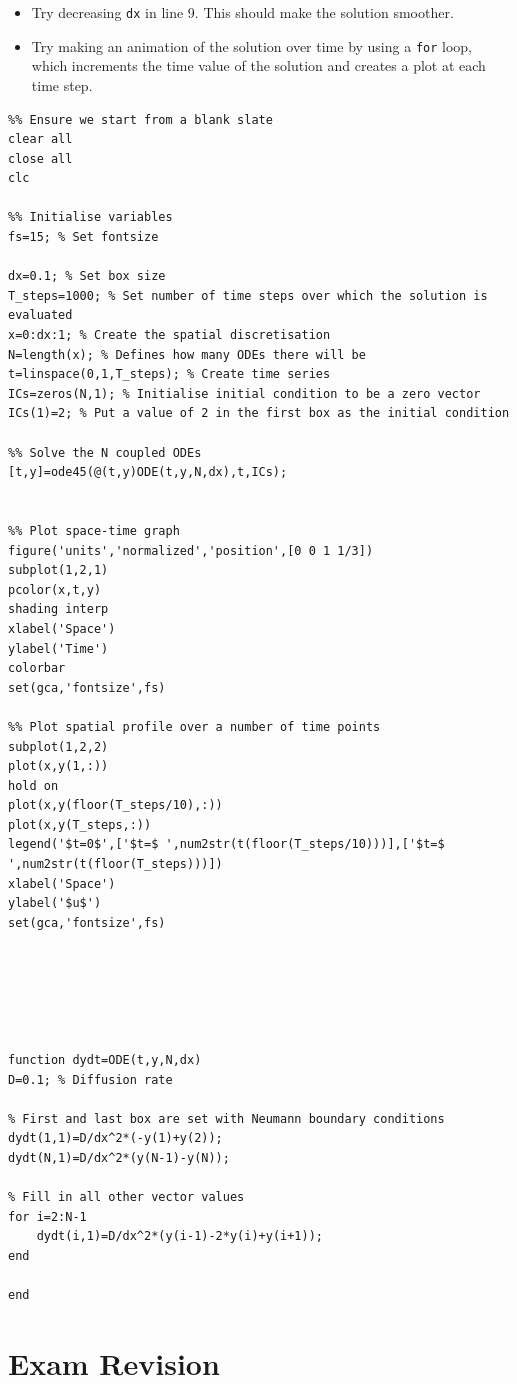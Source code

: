 \documentclass[10pt]{article}
\begin{document}
\begin{itemize}
\item Try decreasing \texttt{dx} in line 9. This should make the solution smoother.
\item Try making an animation of the solution over time by using a \texttt{for} loop, which  increments the time value of the solution and creates a plot at each time step.
\end{itemize}

\lstset{numbers=none}
\begin{lstlisting}
%% Ensure we start from a blank slate
clear all
close all
clc

%% Initialise variables
fs=15; % Set fontsize

dx=0.1; % Set box size
T_steps=1000; % Set number of time steps over which the solution is evaluated
x=0:dx:1; % Create the spatial discretisation
N=length(x); % Defines how many ODEs there will be
t=linspace(0,1,T_steps); % Create time series
ICs=zeros(N,1); % Initialise initial condition to be a zero vector
ICs(1)=2; % Put a value of 2 in the first box as the initial condition

%% Solve the N coupled ODEs
[t,y]=ode45(@(t,y)ODE(t,y,N,dx),t,ICs);


%% Plot space-time graph
figure('units','normalized','position',[0 0 1 1/3])
subplot(1,2,1)
pcolor(x,t,y)
shading interp
xlabel('Space')
ylabel('Time')
colorbar
set(gca,'fontsize',fs)

%% Plot spatial profile over a number of time points
subplot(1,2,2)
plot(x,y(1,:))
hold on
plot(x,y(floor(T_steps/10),:))
plot(x,y(T_steps,:))
legend('$t=0$',['$t=$ ',num2str(t(floor(T_steps/10)))],['$t=$ ',num2str(t(floor(T_steps)))])
xlabel('Space')
ylabel('$u$')
set(gca,'fontsize',fs)






function dydt=ODE(t,y,N,dx)
D=0.1; % Diffusion rate

% First and last box are set with Neumann boundary conditions
dydt(1,1)=D/dx^2*(-y(1)+y(2));
dydt(N,1)=D/dx^2*(y(N-1)-y(N));

% Fill in all other vector values
for i=2:N-1
    dydt(i,1)=D/dx^2*(y(i-1)-2*y(i)+y(i+1));
end

end
\end{lstlisting}




\section*{Exam Revision}
\end{document}
